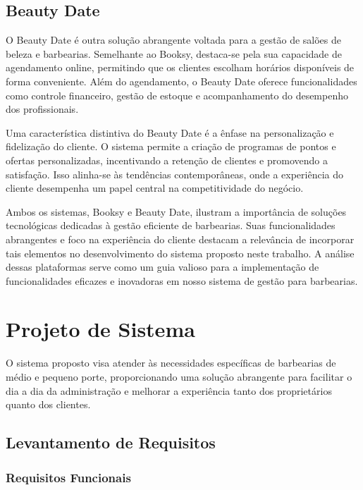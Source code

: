 \documentclass[12pt]{article}
\begin{document}
\subsection{Beauty Date}

O Beauty Date é outra solução abrangente voltada para a gestão de salões de beleza e barbearias. Semelhante ao Booksy, destaca-se pela sua capacidade de agendamento online, permitindo que os clientes escolham horários disponíveis de forma conveniente. Além do agendamento, o Beauty Date oferece funcionalidades como controle financeiro, gestão de estoque e acompanhamento do desempenho dos profissionais.


Uma característica distintiva do Beauty Date é a ênfase na personalização e fidelização do cliente. O sistema permite a criação de programas de pontos e ofertas personalizadas, incentivando a retenção de clientes e promovendo a satisfação. Isso alinha-se às tendências contemporâneas, onde a experiência do cliente desempenha um papel central na competitividade do negócio.

Ambos os sistemas, Booksy e Beauty Date, ilustram a importância de soluções tecnológicas dedicadas à gestão eficiente de barbearias. Suas funcionalidades abrangentes e foco na experiência do cliente destacam a relevância de incorporar tais elementos no desenvolvimento do sistema proposto neste trabalho. A análise dessas plataformas serve como um guia valioso para a implementação de funcionalidades eficazes e inovadoras em nosso sistema de gestão para barbearias.

\section{Projeto de Sistema}

O sistema proposto visa atender às necessidades específicas de barbearias de médio e pequeno porte, proporcionando uma solução abrangente para facilitar o dia a dia da administração e melhorar a experiência tanto dos proprietários quanto dos clientes.

\subsection{Levantamento de Requisitos}

\subsubsection{Requisitos Funcionais}
\end{document}
